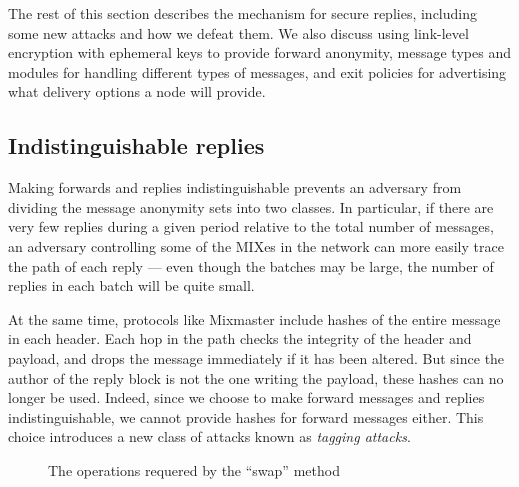 \documentclass{llncs}
\begin{document}
The rest of this section describes the mechanism for secure replies,
including some new attacks and how we defeat them. We also discuss using
link-level encryption with ephemeral keys to provide forward anonymity,
message types and modules for handling different types of messages, and
exit policies for advertising what delivery options a node will provide.



\subsection{Indistinguishable replies}
\label{subsec:header-swap}

Making forwards and replies indistinguishable prevents an adversary from
dividing the message anonymity sets into two classes. In particular, if
there are very few replies during a given period relative to the total
number of messages, an adversary controlling some of the MIXes in the
network can more easily trace the path of each reply --- even though
the batches may be large, the number of replies in each batch will be
quite small.

At the same time, protocols like Mixmaster include hashes of the entire
message in each header. Each hop in the path checks the integrity of
the header and payload, and drops the message immediately if it has been
altered. But since the author of the reply block is not the one writing
the payload, these hashes can no longer be used. Indeed, since we choose
to make forward messages and replies indistinguishable, we cannot provide
hashes for forward messages either. This choice introduces a new class
of attacks known as \emph{tagging attacks}.

\begin{figure}
\begin{center}
\caption{The operations requered by the ``swap'' method} 
\end{center}
\end{figure}
\end{document}
